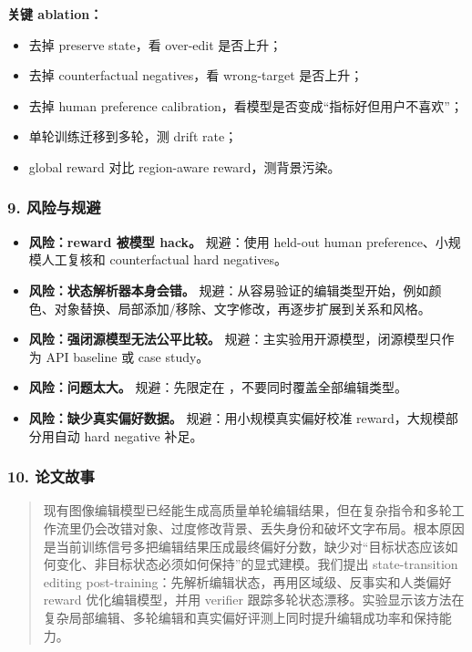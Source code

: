 \textbf{关键 ablation：}

\begin{itemize}[leftmargin=1.5em]
  \item 去掉 preserve state，看 over-edit 是否上升；
  \item 去掉 counterfactual negatives，看 wrong-target 是否上升；
  \item 去掉 human preference calibration，看模型是否变成“指标好但用户不喜欢”；
  \item 单轮训练迁移到多轮，测 drift rate；
  \item global reward 对比 region-aware reward，测背景污染。
\end{itemize}

\subsubsection*{9. 风险与规避}

\begin{itemize}[leftmargin=1.5em]
  \item \textbf{风险：reward 被模型 hack。} 规避：使用 held-out human preference、小规模人工复核和 counterfactual hard negatives。
  \item \textbf{风险：状态解析器本身会错。} 规避：从容易验证的编辑类型开始，例如颜色、对象替换、局部添加/移除、文字修改，再逐步扩展到关系和风格。
  \item \textbf{风险：强闭源模型无法公平比较。} 规避：主实验用开源模型，闭源模型只作为 API baseline 或 case study。
  \item \textbf{风险：问题太大。} 规避：先限定在 ，不要同时覆盖全部编辑类型。
  \item \textbf{风险：缺少真实偏好数据。} 规避：用小规模真实偏好校准 reward，大规模部分用自动 hard negative 补足。
\end{itemize}

\subsubsection*{10. 论文故事}

\begin{quote}
现有图像编辑模型已经能生成高质量单轮编辑结果，但在复杂指令和多轮工作流里仍会改错对象、过度修改背景、丢失身份和破坏文字布局。根本原因是当前训练信号多把编辑结果压成最终偏好分数，缺少对“目标状态应该如何变化、非目标状态必须如何保持”的显式建模。我们提出 state-transition editing post-training：先解析编辑状态，再用区域级、反事实和人类偏好 reward 优化编辑模型，并用 verifier 跟踪多轮状态漂移。实验显示该方法在复杂局部编辑、多轮编辑和真实偏好评测上同时提升编辑成功率和保持能力。
\end{quote}

